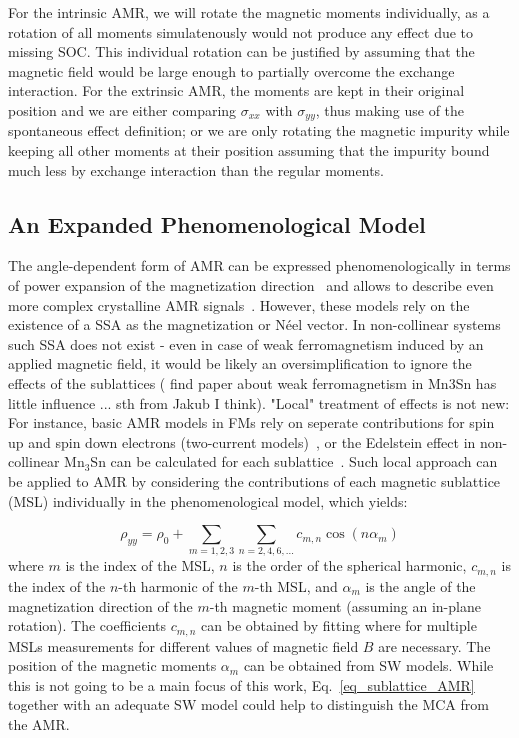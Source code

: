 \documentclass[prb,showpacs,amsmath,amssymb,superscriptaddress,twocolumn,floatfix]{revtex4-1}
\begin{document}
For the intrinsic AMR, we will rotate the magnetic moments individually, as a rotation of all moments simulatenously would not produce any effect due to missing SOC. This individual rotation can be justified by assuming that the magnetic field would be large enough to partially overcome the exchange interaction. For the extrinsic AMR, the moments are kept in their original position and we are either comparing $\sigma_{xx}$ with $\sigma_{yy}$, thus making use of the spontaneous effect definition; or we are only rotating the magnetic impurity while keeping all other moments at their position assuming that the impurity bound much less by exchange interaction than the regular moments. 

\subsection{An Expanded Phenomenological Model}

The angle-dependent form of AMR can be expressed phenomenologically in terms of power expansion of the magnetization direction~\cite{Doring:1938,Limmer:2008,DeRanieri:2008} and allows to describe even more complex crystalline AMR signals~\cite{Ritzinger:2021, Gonzalez-Betancourt:2024, NamHai:2012}. However, these models rely on the existence of a SSA as the magnetization or N\'eel vector. In non-collinear systems such SSA does not exist - even in case of weak ferromagnetism induced by an applied magnetic field, it would be likely an oversimplification to ignore the effects of the sublattices ({\color{red} find paper about weak ferromagnetism in Mn3Sn has little influence ... sth from Jakub I think}). "Local" treatment of effects is not new: For instance, basic AMR models in FMs rely on seperate contributions for spin up and spin down electrons (two-current models)~\cite{Ritzinger:2023}, or the Edelstein effect in non-collinear Mn$_3$Sn can be calculated for each sublattice~\cite{Gonzalez-Hernandez:2024}. Such local approach can be applied to AMR by considering the contributions of each magnetic sublattice (MSL) individually in the phenomenological model, which yields:

\begin{equation}
	\rho_{yy} = \rho_0 + \sum_{m = 1,2,3} \sum_{n = 2, 4, 6, ...} c_{m,n} \cos(n \alpha_m)
	\label{eq_sublattice_AMR}
\end{equation}
where $m$ is the index of the MSL, $n$ is the order of the spherical harmonic, $c_{m,n}$ is the index of the $n$-th harmonic of the $m$-th MSL, and $\alpha_m$ is the angle of the magnetization direction of the $m$-th magnetic moment (assuming an in-plane rotation). The coefficients $c_{m,n}$ can be obtained by fitting where for multiple MSLs measurements for different values of magnetic field $B$ are necessary. The position of the magnetic moments $\alpha_m$ can be obtained from SW models. While this is not going to be a main focus of this work, Eq.~\ref{eq_sublattice_AMR} together with an adequate SW model could help to distinguish the MCA from the AMR.
\end{document}
